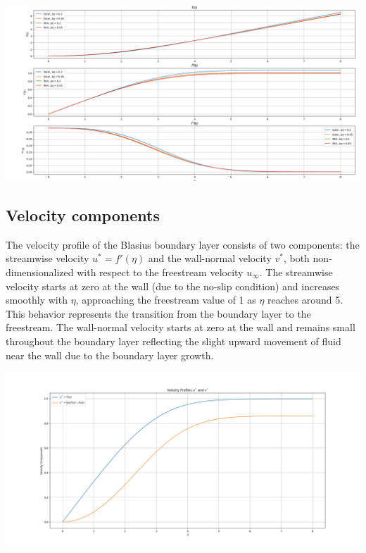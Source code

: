 \documentclass{article}
\begin{document}
\includegraphics[width=\textwidth]{Figure_1.png}\par\vspace{1cm}

\subsection{Velocity components}
The velocity profile of the Blasius boundary layer consists of two components: the streamwise velocity \( u^* = f'(\eta) \) and the wall-normal velocity \( v^* \), 
both non-dimensionalized with respect to the freestream velocity \( u_\infty \). The streamwise velocity starts at zero at the wall (due to the no-slip condition) and increases 
smoothly with \( \eta \), approaching the freestream value of 1 as \( \eta \) reaches around 5. This behavior represents the transition from the boundary layer to the freestream. 
The wall-normal velocity starts at zero at the wall and remains small throughout the boundary layer reflecting the slight upward movement of fluid near the wall due to the boundary layer growth.

\includegraphics[width=\textwidth]{Figure_2.png}\par\vspace{1cm}
\end{document}

